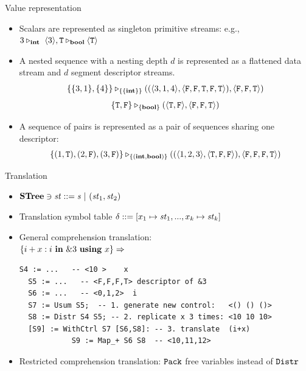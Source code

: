 \documentclass{beamer}
\begin{document}
\begin{frame}{Value representation}
\begin{itemize}
	\item Scalars are represented as singleton primitive streams: e.g., $3 \tr_\int \ \< 3 \'>, \T \tr_\bool \oT $
	
	\item A nested sequence with a nesting depth $d$ is represented as a flattened data stream and $d$ segment descriptor streams. 
	$$\{\{3,1\}, \{4\}\} \tr_{\{\{\int\}\}} ((\< 3,1,4 \'>, \<\F,\F,\T,\F,\T \'>),\< \F, \F, \T \'>)  $$
	$$\{\T,\F\} \tr_{\{\bool\}} (\< \T,\F\'>, \< \F,\F , \T \'>) $$		
	

\item A sequence of pairs is represented as a pair of sequences sharing one descriptor:
	$$\{(1,\T),(2,\F),(3,\F)\} \tr_{\{(\int,\bool)\}} ((\<1,2,3\'>, \<\T,\F, \F\'>), \< \F,\F,\F,\T \'>)$$
\end{itemize}
\end{frame}


\begin{frame}[fragile]{Translation}
\begin{itemize}
	\item $\STree \ni \st ::= \s \ | \ (\st_1,\st_2) $
	\item Translation symbol table $\del ::= [x_1 \|-> \st_1,..., x_k \|-> {\st_k}] $
	\item General comprehension translation:\\
	$\{i+x : i \ \mathbf{in} \ \&3 \ \mathbf{using} \ x\} \Rightarrow$  
{\footnotesize
	\begin{lstlisting}[style=svcode-style]
  S4 := ...   -- <10 >    x
  S5 := ...   -- <F,F,F,T> descriptor of &3 
  S6 := ...   -- <0,1,2>  i
  S7 := Usum S5;  -- 1. generate new control:   <() () ()>
  S8 := Distr S4 S5; -- 2. replicate x 3 times: <10 10 10>
  [S9] := WithCtrl S7 [S6,S8]: -- 3. translate  (i+x)
            S9 := Map_+ S6 S8  -- <10,11,12>
\end{lstlisting}
}
	\item Restricted comprehension translation: $\mathtt{Pack}$ free variables instead of $\mathtt{Distr}$
\end{itemize}
\end{frame}
\end{document}
